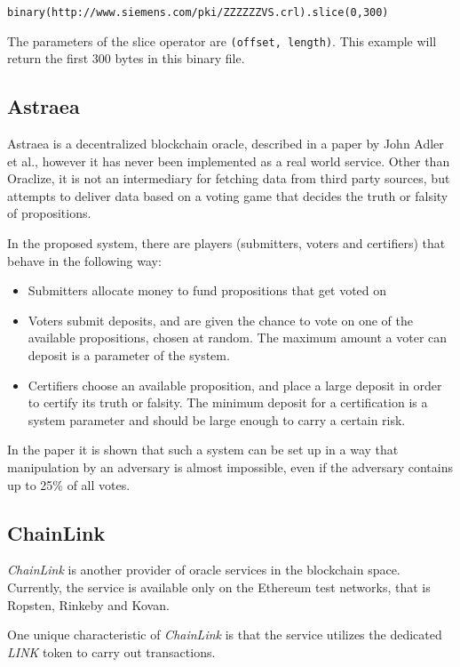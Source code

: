 \texttt{binary(http://www.siemens.com/pki/ZZZZZZVS.crl).slice(0,300)}

The parameters of the slice operator are \texttt{(offset, length)}. This example will return the first 300 bytes in this binary file.
\subsection{Astraea}
Astraea is a decentralized blockchain oracle, described in a paper by John Adler et al., however it has never been implemented as a real world service. Other than Oraclize, it is not an intermediary for fetching data from third party sources, but attempts to deliver data based on a voting game that decides the truth or falsity of propositions.

In the proposed system, there are players (submitters, voters and certifiers) that behave in the following way:
\begin{itemize}
	\item Submitters allocate money to fund propositions that get voted on
	\item Voters submit deposits, and are given the chance to vote on one of the available propositions, chosen at random. The maximum amount a voter can deposit is a parameter of the system.
	\item Certifiers choose an available proposition, and place a large deposit in order to certify its truth or falsity. The minimum deposit for a certification is a system parameter and should be large enough to carry a certain risk.
\end{itemize}
In the paper it is shown that such a system can be set up in a way that manipulation by an adversary is almost impossible, even if the adversary contains up to 25\% of all votes\cite{astraea}.

\subsection{ChainLink}
\emph{ChainLink} is another provider of oracle services in the blockchain space. Currently, the service is available only on the Ethereum test networks, that is Ropsten, Rinkeby and Kovan.

One unique characteristic of \emph{ChainLink} is that the service utilizes the dedicated \emph{LINK} token to carry out transactions. 
